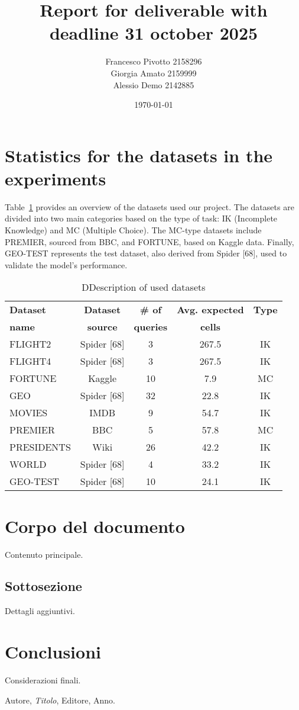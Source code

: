 \documentclass[12pt,a4paper]{article}
\title{Report for deliverable with deadline 31 october 2025}
\author{Francesco Pivotto 2158296\\ Giorgia Amato 2159999\\ Alessio Demo 2142885 }
\date{\today}
\begin{document}
\maketitle

\tableofcontents
\newpage

\section{Statistics for the datasets in the experiments}

Table~\ref{tab:datasets} provides an overview of the datasets used our project. The datasets are divided into two main categories based on the type of task: IK (Incomplete Knowledge) and MC (Multiple Choice).
The MC-type datasets include PREMIER, sourced from BBC, and FORTUNE, based on Kaggle data.
Finally, GEO-TEST represents the test dataset, also derived from Spider [68], used to validate the model's performance.

\begin{table}[h]
\centering
\begin{tabular}{lcccc}
\toprule
\textbf{Dataset} & \textbf{Dataset} & \textbf{\# of} & \textbf{Avg. expected} & \textbf{Type} \\
\textbf{name} & \textbf{source} & \textbf{queries} & \textbf{cells} & \\
\midrule
FLIGHT2 & Spider [68] & 3 & 267.5 & IK \\
FLIGHT4 & Spider [68] & 3 & 267.5 & IK \\
FORTUNE & Kaggle & 10 & 7.9 & MC \\
GEO & Spider [68] & 32 & 22.8 & IK \\
MOVIES & IMDB & 9 & 54.7 & IK \\
PREMIER & BBC & 5 & 57.8 & MC \\
PRESIDENTS & Wiki & 26 & 42.2 & IK \\
WORLD & Spider [68] & 4 & 33.2 & IK \\



\midrule
GEO-TEST & Spider [68] & 10 & 24.1 & IK \\
\bottomrule
\end{tabular}
\caption{DDescription of used datasets}
\label{tab:datasets}
\end{table}

\section{Corpo del documento}
Contenuto principale.

\subsection{Sottosezione}
Dettagli aggiuntivi.

\section{Conclusioni}
Considerazioni finali.

\begin{thebibliography}{9}
Autore, \emph{Titolo}, Editore, Anno.
\end{thebibliography}
\end{document}
